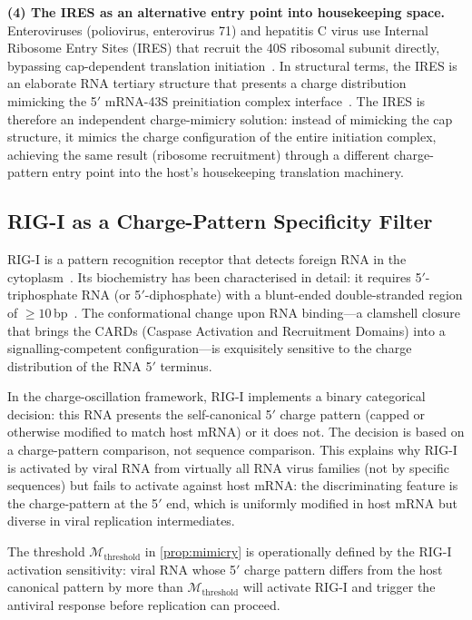 \documentclass[12pt,a4paper]{article}
\theoremstyle{definition}
\theoremstyle{remark}
\begin{document}
\textbf{(4) The IRES as an alternative entry point into housekeeping space.}
Enteroviruses (poliovirus, enterovirus 71) and hepatitis C virus use Internal Ribosome Entry Sites (IRES) that recruit the 40S ribosomal subunit directly, bypassing cap-dependent translation initiation~\cite{Pelletier1988,Tsukiyama1992}. In structural terms, the IRES is an elaborate RNA tertiary structure that presents a charge distribution mimicking the 5$'$ mRNA-43S preinitiation complex interface~\cite{Yamamoto2020,Niepmann2009}. The IRES is therefore an independent charge-mimicry solution: instead of mimicking the cap structure, it mimics the charge configuration of the entire initiation complex, achieving the same result (ribosome recruitment) through a different charge-pattern entry point into the host's housekeeping translation machinery.

\subsection{RIG-I as a Charge-Pattern Specificity Filter}

RIG-I is a pattern recognition receptor that detects foreign RNA in the cytoplasm~\cite{Yoneyama2004}. Its biochemistry has been characterised in detail: it requires 5$'$-triphosphate RNA (or 5$'$-diphosphate) with a blunt-ended double-stranded region of $\geq 10$\,bp~\cite{Goubau2014,Devarkar2016}. The conformational change upon RNA binding---a clamshell closure that brings the CARDs (Caspase Activation and Recruitment Domains) into a signalling-competent configuration---is exquisitely sensitive to the charge distribution of the RNA 5$'$ terminus.

In the charge-oscillation framework, RIG-I implements a binary categorical decision: this RNA presents the self-canonical 5$'$ charge pattern (capped or otherwise modified to match host mRNA) or it does not. The decision is based on a charge-pattern comparison, not sequence comparison. This explains why RIG-I is activated by viral RNA from virtually all RNA virus families (not by specific sequences) but fails to activate against host mRNA: the discriminating feature is the charge-pattern at the 5$'$ end, which is uniformly modified in host mRNA but diverse in viral replication intermediates.

The threshold $\mathcal{M}_{\mathrm{threshold}}$ in \cref{prop:mimicry} is operationally defined by the RIG-I activation sensitivity: viral RNA whose 5$'$ charge pattern differs from the host canonical pattern by more than $\mathcal{M}_{\mathrm{threshold}}$ will activate RIG-I and trigger the antiviral response before replication can proceed.
\end{document}
